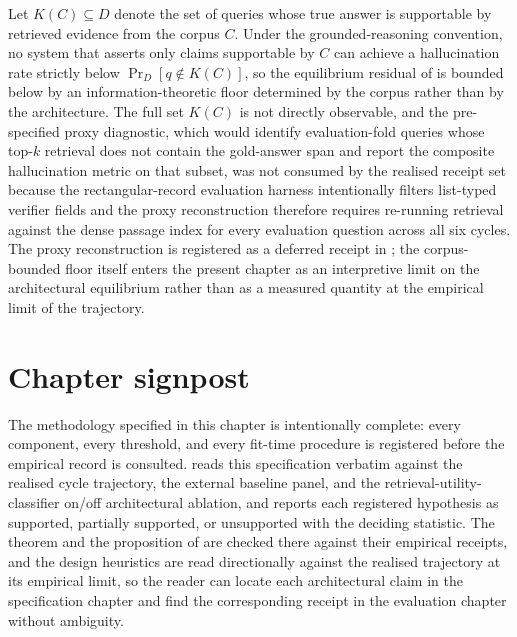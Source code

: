 \begin{remark}
\label{cor:corpus-floor}
Let $K(C) \subseteq D$ denote the set of queries whose true answer is supportable by retrieved evidence from the corpus $C$. Under the grounded-reasoning convention, no system that asserts only claims supportable by $C$ can achieve a hallucination rate strictly below $\Pr_{D}[q \notin K(C)]$, so the equilibrium residual of  is bounded below by an information-theoretic floor determined by the corpus rather than by the architecture. The full set $K(C)$ is not directly observable, and the pre-specified proxy diagnostic, which would identify evaluation-fold queries whose top-$k$ retrieval does not contain the gold-answer span and report the composite hallucination metric on that subset, was not consumed by the realised receipt set because the rectangular-record evaluation harness intentionally filters list-typed verifier fields and the proxy reconstruction therefore requires re-running retrieval against the dense passage index for every evaluation question across all six cycles. The proxy reconstruction is registered as a deferred receipt in ; the corpus-bounded floor itself enters the present chapter as an interpretive limit on the architectural equilibrium rather than as a measured quantity at the empirical limit of the trajectory.
\end{remark}


\section{Chapter signpost}
\label{sec:ch4-signpost}

The methodology specified in this chapter is intentionally complete: every component, every threshold, and every fit-time procedure is registered before the empirical record is consulted.  reads this specification verbatim against the realised cycle trajectory, the external baseline panel, and the retrieval-utility-classifier on/off architectural ablation, and reports each registered hypothesis as supported, partially supported, or unsupported with the deciding statistic. The theorem and the proposition of  are checked there against their empirical receipts, and the design heuristics are read directionally against the realised trajectory at its empirical limit, so the reader can locate each architectural claim in the specification chapter and find the corresponding receipt in the evaluation chapter without ambiguity.
